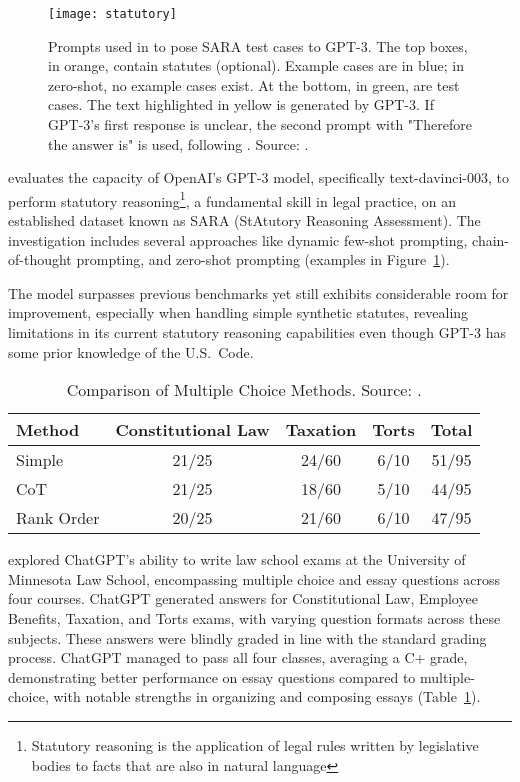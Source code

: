\begin{figure}[!h]
	\centering
	\texttt{[image: statutory]}
	\caption{Prompts used in \protect\textcite{blairstanek2023gpt3statutory} to pose SARA test cases to GPT-3. The top boxes, in orange, contain statutes (optional). Example cases are in blue; in zero-shot, no example cases exist. At the bottom, in green, are test cases. The text highlighted in yellow is generated by GPT-3. If GPT-3’s first response is unclear, the second prompt with "Therefore the answer is" is used, following \protect\textcite{kojima2023large}. Source: \protect\textcite{trautmann2022legalprompt}.}
	\label{fig:legal_prompting}
\end{figure}


\textcite{blairstanek2023gpt3statutory} evaluates the capacity of OpenAI's GPT-3 model, specifically text-davinci-003, to perform statutory reasoning\footnote{Statutory reasoning is the application of legal rules written by legislative bodies to facts that are also in natural language}, a fundamental skill in legal practice, on an established dataset known as SARA (StAtutory Reasoning Assessment).
The investigation includes several approaches like dynamic few-shot prompting, chain-of-thought prompting, and zero-shot prompting (examples in Figure~\ref{fig:legal_prompting}).

The model surpasses previous benchmarks yet still exhibits considerable room for improvement, especially when handling simple synthetic statutes, revealing limitations in its current statutory reasoning capabilities even though GPT-3 has some prior knowledge of the U.S.\ Code.

\begin{table}[!h]
	\centering
	\begin{tabularx}{\textwidth}{Xcccc}
		\toprule
		Method     & Constitutional Law & Taxation & Torts & Total \\
		\midrule
		Simple     & 21/25              & 24/60    & 6/10  & 51/95 \\
		CoT        & 21/25              & 18/60    & 5/10  & 44/95 \\
		Rank Order & 20/25              & 21/60    & 6/10  & 47/95 \\
		\bottomrule
	\end{tabularx}
	\caption{Comparison of Multiple Choice Methods. Source: \protect\textcite{choi2023chatgptlaw}.}
	\label{tab:mc_comparison}
\end{table}

\textcite{choi2023chatgptlaw} explored ChatGPT's ability to write law school exams at the University of Minnesota Law School, encompassing multiple choice and essay questions across four courses.
ChatGPT generated answers for Constitutional Law, Employee Benefits, Taxation, and Torts exams, with varying question formats across these subjects.
These answers were blindly graded in line with the standard grading process.
ChatGPT managed to pass all four classes, averaging a C+ grade, demonstrating better performance on essay questions compared to multiple-choice, with notable strengths in organizing and composing essays (Table~\ref{tab:mc_comparison}).

